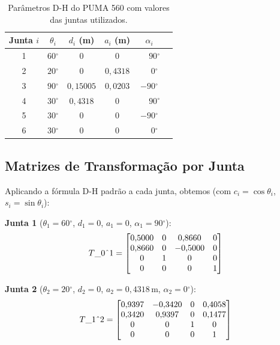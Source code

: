 \documentclass[12pt,a4paper]{article}
\def\Trans#1#2{T\string_#1\string^#2}%
\newcommand{\Trans}[2]{{}^{#1}_{#2}\!\mathbf{T}}
\newcommand{\degr}{\ensuremath{^{\circ}}}
\begin{document}
\begin{table}[h!]
  \centering
  \caption{Par\^ametros D-H do PUMA 560 com valores das juntas utilizados.}
  \label{tab:dh_puma}
  \renewcommand{\arraystretch}{1.3}
  \begin{tabular}{cccccc}
    \toprule
    Junta $i$ & $\theta_i$ & $d_i$ (m) & $a_i$ (m) & $\alpha_i$ \\
    \midrule
    1 & $60\degr$  & $0$       & $0$       & $\phantom{-}90\degr$ \\
    2 & $20\degr$  & $0$       & $0{,}4318$ & $\phantom{-}0\degr$  \\
    3 & $90\degr$  & $0{,}15005$ & $0{,}0203$ & $-90\degr$          \\
    4 & $30\degr$  & $0{,}4318$  & $0$       & $\phantom{-}90\degr$ \\
    5 & $30\degr$  & $0$         & $0$       & $-90\degr$           \\
    6 & $30\degr$  & $0$         & $0$       & $\phantom{-}0\degr$  \\
    \bottomrule
  \end{tabular}
\end{table}

\subsection{Matrizes de Transforma\c{c}\~ao por Junta}

Aplicando a f\'ormula D-H padr\~ao a cada junta, obtemos (com $c_i=\cos\theta_i$, $s_i=\sin\theta_i$):

\textbf{Junta 1} ($\theta_1=60\degr$, $d_1=0$, $a_1=0$, $\alpha_1=90\degr$):
\[
  \Trans{0}{1} =
  \begin{bmatrix}
     0{,}5000 &  0        &  0{,}8660 & 0 \\
     0{,}8660 &  0        & -0{,}5000 & 0 \\
     0        &  1        &  0        & 0 \\
     0        &  0        &  0        & 1
  \end{bmatrix}
\]

\textbf{Junta 2} ($\theta_2=20\degr$, $d_2=0$, $a_2=0{,}4318$\,m, $\alpha_2=0\degr$):
\[
  \Trans{1}{2} =
  \begin{bmatrix}
     0{,}9397 & -0{,}3420 &  0 & 0{,}4058 \\
     0{,}3420 &  0{,}9397 &  0 & 0{,}1477 \\
     0        &  0        &  1 & 0        \\
     0        &  0        &  0 & 1
  \end{bmatrix}
\]
\end{document}
